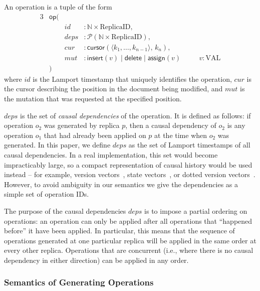\documentclass[10pt,journal,compsoc]{IEEEtran}
\begin{document}
An operation is a tuple of the form
\begin{alignat*}{3}
& \mathsf{op}( \\
&& \mathit{id} &: \mathbb{N} \times \mathrm{ReplicaID}, \\
&& \mathit{deps} &: \mathcal{P}(\mathbb{N} \times \mathrm{ReplicaID}), \\
&& \mathit{cur} &: \mathsf{cursor}(\langle k_1, \dots, k_{n-1} \rangle,\, k_n), \\
&& \mathit{mut} &: \mathsf{insert}(v) \mid \mathsf{delete} \mid \mathsf{assign}(v) && \quad v: \mathrm{VAL} \\
& )
\end{alignat*}
where $\mathit{id}$ is the Lamport timestamp that uniquely identifies the operation, $\mathit{cur}$ is the cursor describing the position in the document being modified, and $\mathit{mut}$ is the mutation that was requested at the specified position.

$\mathit{deps}$ is the set of \emph{causal dependencies} of the operation. It is defined as follows: if operation $o_2$ was generated by replica $p$, then a causal dependency of $o_2$ is any operation $o_1$ that had already been applied on $p$ at the time when $o_2$ was generated. In this paper, we define $\mathit{deps}$ as the set of Lamport timestamps of all causal dependencies. In a real implementation, this set would become impracticably large, so a compact representation of causal history would be used instead -- for example, version vectors~\cite{ParkerJr:1983jb}, state vectors~\cite{Ellis:1989ue}, or dotted version vectors~\cite{Preguica:2012fx}. However, to avoid ambiguity in our semantics we give the dependencies as a simple set of operation IDs.

The purpose of the causal dependencies $\mathit{deps}$ is to impose a partial ordering on operations: an operation can only be applied after all operations that ``happened before'' it have been applied. In particular, this means that the sequence of operations generated at one particular replica will be applied in the same order at every other replica. Operations that are concurrent (i.e., where there is no causal dependency in either direction) can be applied in any order.

\subsubsection{Semantics of Generating Operations}
\end{document}
